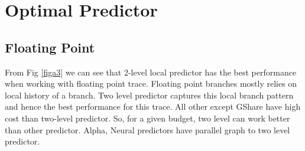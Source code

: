 \documentclass[conference]{IEEEtran}
\begin{document}
%






\section{Optimal Predictor}
\subsection{Floating Point}
From Fig \ref{figa3} we can see that 2-level local predictor has the best performance when working with floating point trace. Floating point branches mostly relies on local history of a branch. Two level predictor captures this local branch pattern and hence the best performance for this trace. All other except GShare have high cost than two-level predictor. So, for a given budget, two level can work better than other predictor. Alpha, Neural predictors have parallel graph to two level predictor. 
\end{document}
